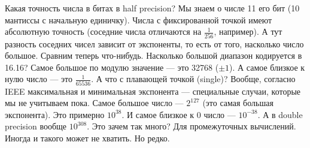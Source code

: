 \documentclass{article}
\begin{document}
    Какая точность числа в битах в half precision? Мы знаем о числе 11 его бит (10 мантиссы с начальную единичку). Числа с фиксированной точкой имеют абсолютную точность (соседние числа отличаются на $\frac1{256}$, например). А тут разность соседних чисел зависит от экспоненты, то есть от того, насколько число большое. Сравним теперь что-нибудь. Насколько большой диапазон кодируется в 16.16? Самое большое по модулю значение --- это 32768 ($\pm1$). А самое близкое к нулю число --- это $\frac1{65536}$. А что с плавающей точкой (single)? Вообще, согласно IEEE максимальная и минимальная экспонента --- специальные случаи, которые мы не учитываем пока. Самое большое число --- $2^{127}$ (это самая большая экспонента). Это примерно $10^{38}$. И самое близкое к $0$ число --- $10^{-38}$. А в double precision вообще $10^{308}$. Это зачем так много? Для промежуточных вычислений. Иногда и такого может не хватить. Но редко.\\
\end{document}
